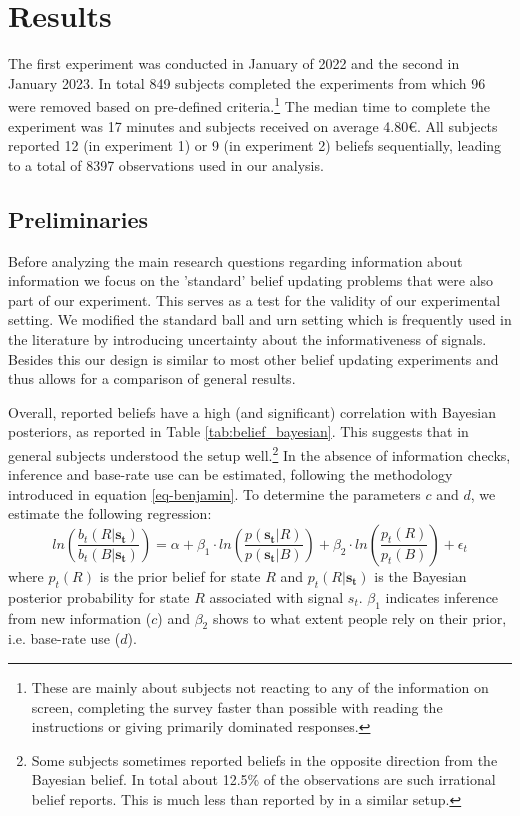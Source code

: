 \documentclass{article}
\begin{document}
\section{Results}

The first experiment was conducted in January of 2022 and the second in January 2023. In total 849 subjects completed the experiments from which 96 were removed based on pre-defined criteria.\footnote{These are mainly about subjects not reacting to any of the information on screen, completing the survey faster than possible with reading the instructions or giving primarily dominated responses.} The median time to complete the experiment was 17 minutes and subjects received on average 4.80\euro. All subjects reported 12 (in experiment 1) or 9 (in experiment 2) beliefs sequentially, leading to a total of 8397 observations used in our analysis.


\subsection{Preliminaries}

Before analyzing the main research questions regarding information about information we focus on the 'standard' belief updating problems that were also part of our experiment. This serves as a test for the validity of our experimental setting. We modified the standard ball and urn setting which is frequently used in the literature by introducing uncertainty about the informativeness of signals. Besides this our design is similar to most other belief updating experiments and thus allows for a comparison of general results.

Overall, reported beliefs have a high (and significant) correlation with Bayesian posteriors, as reported in Table \ref{tab:belief_bayesian}. This suggests that in general subjects understood the setup well.\footnote{Some subjects sometimes reported beliefs in the opposite direction from the Bayesian belief. In total about 12.5\% of the observations are such irrational belief reports. This is much less than reported by \cite{Goncalves2022} in a similar setup.} In the absence of information checks, inference and base-rate use can be estimated, following the methodology introduced in equation \ref{eq-benjamin}. To determine the parameters $c$ and $d$, we estimate the following regression:
\begin{equation}
\label{eq-reg-inference}
ln(\frac{b_t(R|\mathbf{s_t})}{b_t(B|\mathbf{s_t})}) = \alpha + \beta_1 \cdot ln(\frac{p(\mathbf{s_t}|R)}{p(\mathbf{s_t}|B)}) + \beta_2 \cdot ln(\frac{p_t(R)}{p_t(B)}) + \epsilon_t
\end{equation}
where $p_t(R)$ is the prior belief for state $R$ and $p_t(R|\mathbf{s_t})$ is the Bayesian posterior probability for state $R$ associated with signal $s_t$. $\beta_1$ indicates inference from new information ($c$) and $\beta_2$ shows to what extent people rely on their prior, i.e. base-rate use ($d$). 
\end{document}
